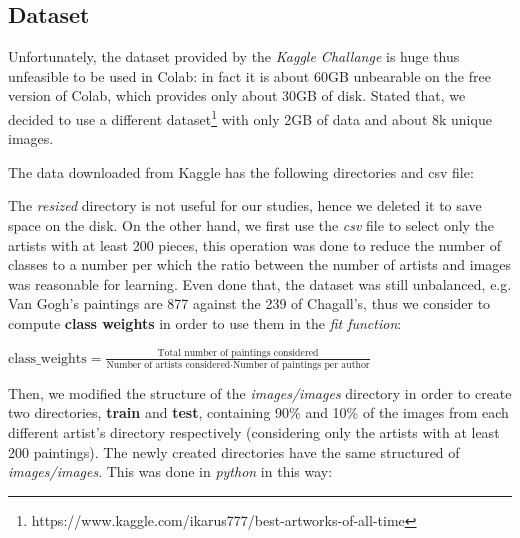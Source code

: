 \subsection{Dataset}
Unfortunately, the dataset provided by the \textit{Kaggle Challange} is huge thus unfeasible to be used in Colab: in fact it is about 60GB unbearable on the free version of Colab, which provides only about 30GB of disk. Stated that, we decided to use a different dataset\footnote{https://www.kaggle.com/ikarus777/best-artworks-of-all-time} with only 2GB of data and about 8k unique images.

\noindent The data downloaded from Kaggle has the following directories and csv file:

\noindent The \textit{resized} directory is not useful for our studies, hence we deleted it to save space on the disk. On the other hand, we first use the \textit{csv} file to select only the artists with at least 200 pieces, this operation was done to reduce the number of classes to a number per which the ratio between the number of artists and images was reasonable for learning. Even done that, the dataset was still unbalanced, e.g. Van Gogh's paintings are 877 against the 239 of Chagall's, thus we consider to compute \textbf{class weights} in order to use them in the \textit{fit function}:

$
	\text{class\_weights} = \frac{\text{Total number of paintings considered}}{\text{Number of artists considered}\cdot \text{Number of paintings per author}}
$

\noindent Then, we modified the structure of the \textit{images/images} directory in order to create two directories, \textbf{train} and \textbf{test}, containing 90\% and 10\% of the images from each different artist's directory respectively (considering only the artists with at least 200 paintings). The newly created directories have the same structured of \textit{images/images}. This was done in \textit{python} in this way:

